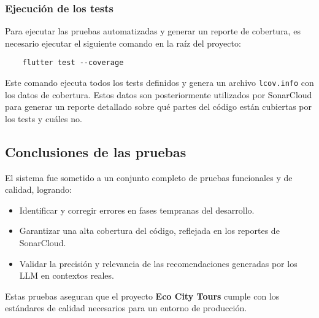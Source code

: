 \subsubsection{Ejecución de los tests}

Para ejecutar las pruebas automatizadas y generar un reporte de cobertura, es necesario ejecutar el siguiente comando en la raíz del proyecto:
\begin{verbatim}
	flutter test --coverage
\end{verbatim}

Este comando ejecuta todos los tests definidos y genera un archivo \texttt{lcov.info} con los datos de cobertura. Estos datos son posteriormente utilizados por SonarCloud para generar un reporte detallado sobre qué partes del código están cubiertas por los tests y cuáles no.
\subsection{Conclusiones de las pruebas}

El sistema fue sometido a un conjunto completo de pruebas funcionales y de calidad, logrando:
\begin{itemize}
	\item Identificar y corregir errores en fases tempranas del desarrollo.
	\item Garantizar una alta cobertura del código, reflejada en los reportes de SonarCloud.
	\item Validar la precisión y relevancia de las recomendaciones generadas por los LLM en contextos reales.
\end{itemize}

Estas pruebas aseguran que el proyecto \textbf{Eco City Tours} cumple con los estándares de calidad necesarios para un entorno de producción.
